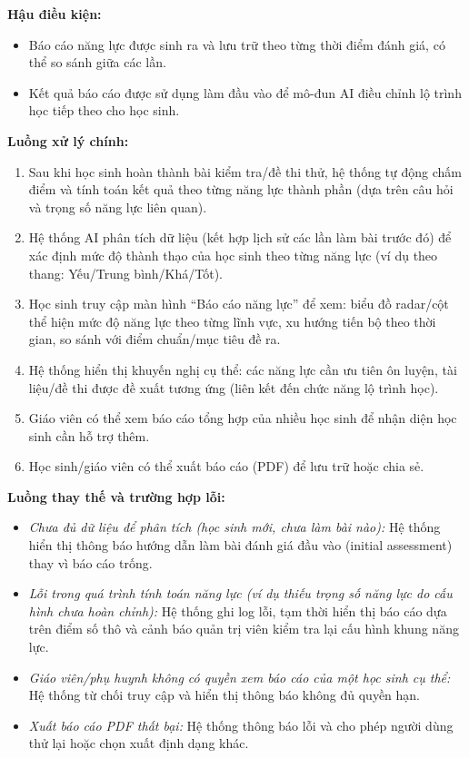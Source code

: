 \documentclass[12pt,a4paper]{article}
\newcommand{\ucfield}[2]{\noindent\textbf{#1: } #2\par\vspace{0.35em}}
\begin{document}
	\ucfield{Hậu điều kiện}{
		\begin{itemize}[nosep]
			\item Báo cáo năng lực được sinh ra và lưu trữ theo từng thời điểm đánh giá, có thể so sánh giữa các lần.
			\item Kết quả báo cáo được sử dụng làm đầu vào để mô-đun AI điều chỉnh lộ trình học tiếp theo cho học sinh.
	\end{itemize}}
	
	\ucfield{Luồng xử lý chính}{
		\begin{enumerate}[nosep]
			\item Sau khi học sinh hoàn thành bài kiểm tra/đề thi thử, hệ thống tự động chấm điểm và tính toán kết quả theo từng năng lực thành phần (dựa trên câu hỏi và trọng số năng lực liên quan).
			\item Hệ thống AI phân tích dữ liệu (kết hợp lịch sử các lần làm bài trước đó) để xác định mức độ thành thạo của học sinh theo từng năng lực (ví dụ theo thang: Yếu/Trung bình/Khá/Tốt).
			\item Học sinh truy cập màn hình ``Báo cáo năng lực'' để xem: biểu đồ radar/cột thể hiện mức độ năng lực theo từng lĩnh vực, xu hướng tiến bộ theo thời gian, so sánh với điểm chuẩn/mục tiêu đề ra.
			\item Hệ thống hiển thị khuyến nghị cụ thể: các năng lực cần ưu tiên ôn luyện, tài liệu/đề thi được đề xuất tương ứng (liên kết đến chức năng lộ trình học).
			\item Giáo viên có thể xem báo cáo tổng hợp của nhiều học sinh để nhận diện học sinh cần hỗ trợ thêm.
			\item Học sinh/giáo viên có thể xuất báo cáo (PDF) để lưu trữ hoặc chia sẻ.
	\end{enumerate}}
	
	\ucfield{Luồng thay thế và trường hợp lỗi}{
		\begin{itemize}[nosep]
			\item \textit{Chưa đủ dữ liệu để phân tích (học sinh mới, chưa làm bài nào):} Hệ thống hiển thị thông báo hướng dẫn làm bài đánh giá đầu vào (initial assessment) thay vì báo cáo trống.
			\item \textit{Lỗi trong quá trình tính toán năng lực (ví dụ thiếu trọng số năng lực do cấu hình chưa hoàn chỉnh):} Hệ thống ghi log lỗi, tạm thời hiển thị báo cáo dựa trên điểm số thô và cảnh báo quản trị viên kiểm tra lại cấu hình khung năng lực.
			\item \textit{Giáo viên/phụ huynh không có quyền xem báo cáo của một học sinh cụ thể:} Hệ thống từ chối truy cập và hiển thị thông báo không đủ quyền hạn.
			\item \textit{Xuất báo cáo PDF thất bại:} Hệ thống thông báo lỗi và cho phép người dùng thử lại hoặc chọn xuất định dạng khác.
	\end{itemize}}
	
\end{document}
